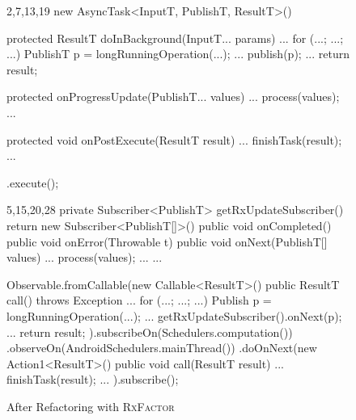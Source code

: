 \begin{figure}[h]
\begin{minipage}{0.48\textwidth}
\begin{sourcecode}
\begin{javacode}{2,7,13,19}
new AsyncTask<InputT, PublishT, ResultT>(){
	protected ResultT doInBackground(InputT... params){
		...
		for (...; ...; ...){
			PublishT p = longRunningOperation(...);
			...
			publish(p);
		}
		...
		return result;
	}
	
	protected onProgressUpdate(PublishT... values){
		...
		process(values);
		...
	}
	
	protected void onPostExecute(ResultT result){
		...
		finishTask(result);
		...
	}
}.execute();
\end{javacode}
\caption{Before Refactoring with \textsc{RxFactor}}
\label{code:rxfactor-before}
\end{sourcecode}
\end{minipage}\hspace{0.7cm}
\begin{minipage}{0.48\textwidth}
\begin{sourcecode}
\begin{javacode}{5,15,20,28}
private Subscriber<PublishT> getRxUpdateSubscriber() {
	return new Subscriber<PublishT[]>(){
		public void onCompleted(){ }		
		public void onError(Throwable t) { }		
		public void onNext(PublishT[] values){
			...
			process(values);
			...
		}
	}
}
...

Observable.fromCallable(new Callable<ResultT>() {
	public ResultT call() throws Exception{
		...
		for (...; ...; ...){
			Publish p = longRunningOperation(...);
			...
			getRxUpdateSubscriber().onNext(p);
		}
		...
		return result;
	}
}).subscribeOn(Schedulers.computation())
  .observeOn(AndroidSchedulers.mainThread())
  .doOnNext(new Action1<ResultT>(){
  	public void call(ResultT result) {
		...
		finishTask(result);
		...
  	}
}).subscribe();
\end{javacode}
\caption{After Refactoring with \textsc{RxFactor}}
\label{code:rxfactor-after}
\end{sourcecode}
\end{minipage}
\end{figure}